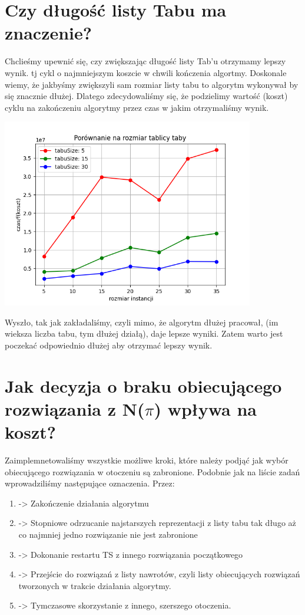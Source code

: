 \documentclass{article}
\begin{document}
    \section{Czy długość listy Tabu ma znaczenie? }

    Chclieśmy upewnić się, czy zwiększając długość listy
    Tab'u otrzymamy lepszy wynik. tj cykl o najmniejszym koszcie
    w chwili kończenia algortmy. Doskonale wiemy, że jakbyśmy
    zwiększyli sam rozmiar listy tabu to algorytm wykonywał by
    się znacznie dłużej. Dlatego zdecydowaliśmy się, że podzielimy
    wartość (koszt) cyklu na zakończeniu algorytmy przez czas w jakim
    otrzymaliśmy wynik.

    \includegraphics[width=11cm]{./spr2img/Figure_4.png}

    Wyszło, tak jak zakładaliśmy, czyli mimo, że algorytm dłużej
    pracował, (im wieksza liczba tabu, tym dłużej działą), daje lepsze
    wyniki. Zatem warto jest poczekać odpowiednio dłużej aby otrzymać
    lepszy wynik.

    \section{Jak decyzja o braku obiecującego rozwiązania z N($\pi$)
            wpływa na koszt?}

    Zaimplemnetowaliśmy wszystkie możliwe kroki, które należy podjąć
    jak wybór obiecującego rozwiązania w otoczeniu są zabronione. Podobnie
    jak na liście zadań wprowadziliśmy następujące oznaczenia. Przez:

    \begin{enumerate}
        \item -> Zakończenie działania algorytmu
        \item -> Stopniowe odrzucanie najstarszych reprezentacji z 
                 listy tabu tak długo aż co najmniej jedno rozwiązanie 
                 nie jest zabronione
        \item -> Dokonanie restartu TS z innego rozwiązania początkowego
        \item -> Przejście do rozwiązań z listy nawrotów, czyli listy 
                 obiecujących rozwiązań tworzonych w trakcie działania algorytmy.
        \item -> Tymczasowe skorzystanie z innego, szerszego otoczenia.
    \end{enumerate}
 
\end{document}
